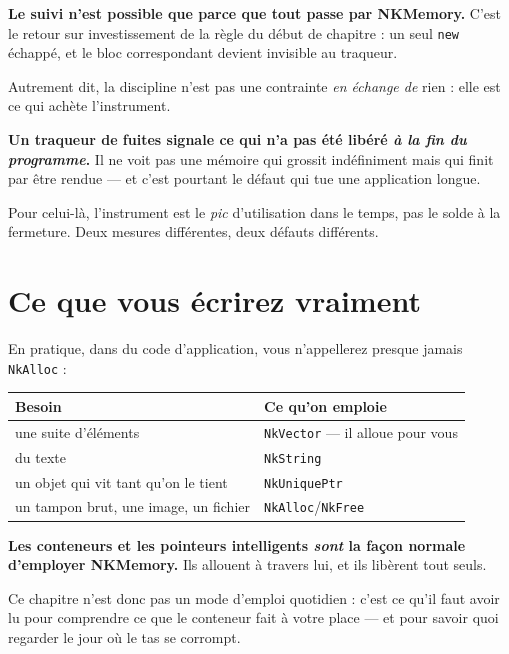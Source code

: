 \begin{nkretenir}
\textbf{Le suivi n'est possible que parce que tout passe par NKMemory.} C'est le
retour sur investissement de la règle du début de chapitre : un seul \texttt{new}
échappé, et le bloc correspondant devient invisible au traqueur.

Autrement dit, la discipline n'est pas une contrainte \emph{en échange de} rien :
elle est ce qui achète l'instrument.
\end{nkretenir}

\begin{nkpiege}
\textbf{Un traqueur de fuites signale ce qui n'a pas été libéré \emph{à la fin du
programme}.} Il ne voit pas une mémoire qui grossit indéfiniment mais qui finit
par être rendue --- et c'est pourtant le défaut qui tue une application longue.

Pour celui-là, l'instrument est le \emph{pic} d'utilisation dans le temps, pas le
solde à la fermeture. Deux mesures différentes, deux défauts différents.
\end{nkpiege}

\section{Ce que vous écrirez vraiment}

En pratique, dans du code d'application, vous n'appellerez presque jamais
\texttt{NkAlloc} :

\begin{center}
\begin{tabular}{@{}ll@{}}
\toprule
\textbf{Besoin} & \textbf{Ce qu'on emploie} \\
\midrule
une suite d'éléments & \texttt{NkVector} --- il alloue pour vous \\
du texte & \texttt{NkString} \\
un objet qui vit tant qu'on le tient & \texttt{NkUniquePtr} \\
un tampon brut, une image, un fichier & \texttt{NkAlloc}/\texttt{NkFree} \\
\bottomrule
\end{tabular}
\end{center}

\begin{nkretenir}
\textbf{Les conteneurs et les pointeurs intelligents \emph{sont} la façon normale
d'employer NKMemory.} Ils allouent à travers lui, et ils libèrent tout seuls.

Ce chapitre n'est donc pas un mode d'emploi quotidien : c'est ce qu'il faut avoir
lu pour comprendre ce que le conteneur fait à votre place --- et pour savoir quoi
regarder le jour où le tas se corrompt.
\end{nkretenir}

